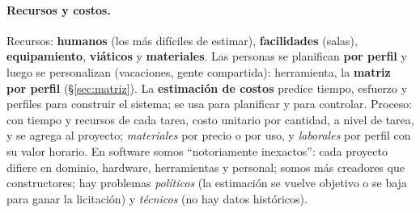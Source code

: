 \documentclass[11pt,a4paper]{article}
\begin{document}
\paragraph{Recursos y costos.} Recursos: \textbf{humanos} (los más difíciles de estimar), \textbf{facilidades}
(salas), \textbf{equipamiento}, \textbf{viáticos} y \textbf{materiales}. Las personas se planifican \textbf{por
perfil} y luego se personalizan (vacaciones, gente compartida): herramienta, la \textbf{matriz por perfil}
(§\ref{sec:matriz}). La \textbf{estimación de costos} predice tiempo, esfuerzo y perfiles para construir el
sistema; se usa para planificar y para controlar. Proceso: con tiempo y recursos de cada tarea, costo unitario
por cantidad, a nivel de tarea, y se agrega al proyecto; \emph{materiales} por precio o por uso, y
\emph{laborales} por perfil con su valor horario. En software somos ``notoriamente inexactos'': cada proyecto
difiere en dominio, hardware, herramientas y personal; somos más creadores que constructores; hay problemas
\emph{políticos} (la estimación se vuelve objetivo o se baja para ganar la licitación) y \emph{técnicos}
(no hay datos históricos).
\end{document}
